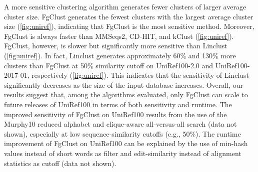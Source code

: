 \documentclass[11pt,letterpaper]{article}
\begin{document}
A more sensitive clustering algorithm generates fewer clusters of larger average cluster size.
FgClust generates the fewest clusters with the largest average cluster size (\cref{fig:uniref}), indicating that FgClust is the most sensitive method.
Moreover, FgClust is always faster than MMSeqs2, CD-HIT, and kClust (\cref{fig:uniref}).
FgClust, however, is slower but significantly more sensitive than Linclust  (\cref{fig:uniref}).
In fact, Linclust generates approximately 60\% and 130\% more clusters than FgClust at 50\% similarity cutoff on UniRef100-2.0 and UniRef100-2017-01, respectively (\cref{fig:uniref}).
This indicates that the sensitivity of Linclust significantly decreases as the size of the input database increases. 
Overall, our results suggest that, among the algorithms evaluated, only FgClust can scale to future releases of UniRef100 in terms of both sensitivity and runtime.
The improved sensitivity of FgClust on UniRef100 
results from the use of the Murphy10 reduced alphabet and clique-aware all-versus-all search (data not shown), especially at low sequence-similarity cutoffs (e.g., 50\%).
The runtime improvement of FgClust on UniRef100 can be explained by the use of min-hash values instead of short words as filter and edit-similarity instead of alignment statistics as cutoff (data not shown).
\end{document}
